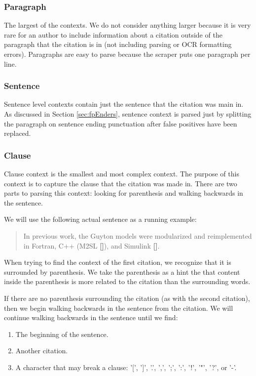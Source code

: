 \documentclass[10pt, conference, compsocconf]{IEEEtran}
\begin{document}
\subsubsection{Paragraph}
The largest of the contexts. We do not consider anything larger because it is very rare for an author to include information about a citation
outside of the paragraph that the citation is in (not including parsing or OCR formatting errors). Paragraphs are easy to parse because the
scraper puts one paragraph per line.

\subsubsection{Sentence}
Sentence level contexts contain just the sentence that the citation was main in. As discussed in Section \ref{sec:fpEnders},
sentence context is parsed just by splitting the paragraph on sentence ending punctuation after false positives have been replaced.

\subsubsection{Clause}
Clause context is the smallest and most complex context. The purpose of this context is to capture the clause that the citation was made in.
There are two parts to parsing this context: looking for parenthesis and walking backwards in the sentence.

We will use the following actual sentence as a running example:
\begin{quote}
In previous work, the Guyton models were modularized and reimplemented in Fortran, C++ (M2SL \textbf{[]}), and Simulink \textbf{[]}.
\end{quote}

When trying to find the context of the first citation, we recognize that it is surrounded by parenthesis.
We take the parenthesis as a hint the that content inside the parenthesis is more related to the citation than the surrounding words.

If there are no parenthesis surrounding the citation (as with the second citation), then we begin walking backwards in the sentence from the citation.
We will continue walking backwards in the sentence until we find:
\begin{enumerate}
   \item The beginning of the sentence.
   \item Another citation.
   \item A character that may break a clause: '[', ']', '.', ',', ';', ':', '!', '"', '?', or '-'.
\end{enumerate}
\end{document}
